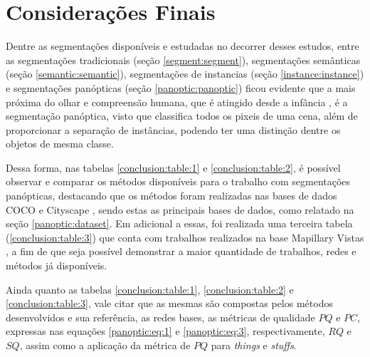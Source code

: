 \newpage
\clearpage
\section{Considerações Finais}
\label{final:final}

Dentre as segmentações disponíveis e estudadas no decorrer desses estudos, entre as segmentações tradicionais (seção \ref{segment:segment}), segmentações semânticas (seção \ref{semantic:semantic}), segmentações de instancias (seção \ref{instance:instance}) e segmentações panópticas (seção \ref{panoptic:panoptic}) ficou evidente que a mais próxima do olhar e compreensão humana, que é atingido desde a infância \cite{Mohan2020}, é a segmentação panóptica, visto que classifica todos os pixeis de uma cena, além de proporcionar a separação de instâncias, podendo ter uma distinção dentre os objetos de mesma classe.

Dessa forma, nas tabelas \ref{conclusion:table:1} e \ref{conclusion:table:2}, é possível observar e comparar os métodos disponíveis para o trabalho com segmentações panópticas, destacando que os métodos foram realizadas nas bases de dados COCO \cite{Lin2014} e Cityscape \cite{Cordts2016}, sendo estas as principais bases de dados, como relatado na seção \ref{panoptic:dataset}. Em adicional a essas, foi realizada uma terceira tabela (\ref{conclusion:table:3}) que conta com trabalhos realizados na base Mapillary Vistas \cite{Neuhold2017_ICCV}, a fim de que seja possível demonstrar a maior quantidade de trabalhos, redes e métodos já disponíveis.

Ainda quanto as tabelas \ref{conclusion:table:1}, \ref{conclusion:table:2} e \ref{conclusion:table:3}, vale citar que as mesmas são compostas pelos métodos desenvolvidos e sua referência, as redes bases, as métricas de qualidade $PQ$ e $PC$, expressas nas equações \ref{panoptic:eq:1} e \ref{panoptic:eq:3}, respectivamente, $RQ$ e $SQ$, assim como a aplicação da métrica de $PQ$ para \textit{things} e \textit{stuffs}.

